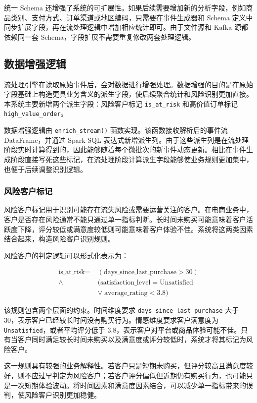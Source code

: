 \documentclass[12pt,hyperref,a4paper,UTF8]{ctexart}
\begin{document}
统一 Schema 还增强了系统的可扩展性。如果后续需要增加新的分析字段，例如商品类别、支付方式、订单渠道或地区编码，只需要在事件生成器和 Schema 定义中同步扩展字段，再在流处理逻辑中增加相应统计即可。由于文件源和 Kafka 源都依赖同一套 Schema，字段扩展不需要重复修改两套处理逻辑。

\subsection{数据增强逻辑}

流处理引擎在读取原始事件后，会对数据进行增强处理。数据增强的目的是在原始字段基础上构造更具业务含义的派生字段，使后续聚合统计和风险识别更加直接。本系统主要新增两个派生字段：风险客户标记 \texttt{is\_at\_risk} 和高价值订单标记 \texttt{high\_value\_order}。

数据增强逻辑由 \texttt{enrich\_stream()} 函数实现。该函数接收解析后的事件流 DataFrame，并通过 Spark SQL 表达式新增派生列。由于这些派生列是在流处理阶段实时计算得到的，因此能够随着每个微批次的新事件动态更新。相比在事件生成阶段直接写死这些标记，在流处理阶段计算派生字段能够使业务规则更加集中，也便于后续调整识别逻辑。

\subsubsection{风险客户标记}

风险客户标记用于识别可能存在流失风险或需要运营关注的客户。在电商业务中，客户是否存在风险通常不能只通过单一指标判断。长时间未购买可能意味着客户活跃度下降，评分较低或满意度较低则可能意味着客户体验不佳。系统将这两类因素结合起来，构造风险客户识别规则。

风险客户的判定逻辑可以形式化表示为：

\[
\begin{aligned}
\text{is\_at\_risk} =\; &(\text{days\_since\_last\_purchase} > 30) \\
\land\; &(\text{satisfaction\_level} = \text{Unsatisfied} \\
&\lor\; \text{average\_rating} < 3.8)
\end{aligned}
\]

该规则包含两个层面的约束。时间维度要求 \texttt{days\_since\_last\_purchase} 大于 30，表示客户已经较长时间没有购买行为。情感维度要求客户满意度为 \texttt{Unsatisfied}，或者平均评分低于 3.8，表示客户对平台或商品体验可能不佳。只有当客户同时满足较长时间未购买以及满意度或评分较低时，系统才将其标记为风险客户。

这一规则具有较强的业务解释性。若客户只是短期未购买，但评分较高且满意度较好，则不应过早判定为风险客户；若客户评分偏低但近期仍有购买行为，也可能只是一次短期体验波动。将时间因素和满意度因素结合，可以减少单一指标带来的误判，使风险客户识别更加稳健。
\end{document}
